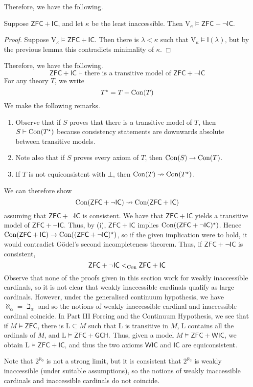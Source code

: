 Therefore, we have the following.
\begin{theorem}
    Suppose \( \mathsf{ZFC} + \mathsf{IC} \), and let \( \kappa \) be the least inaccessible.
    Then \( \mathrm{V}_\kappa \vDash \mathsf{ZFC} + \neg\mathsf{IC} \).
\end{theorem}
\begin{proof}
    Suppose \( \mathrm{V}_\kappa \vDash \mathsf{ZFC} + \mathsf{IC} \).
    Then there is \( \lambda < \kappa \) such that \( \mathrm{V}_\kappa \vDash \mathsf{I}(\lambda) \), but by the previous lemma this contradicts minimality of \( \kappa \).
\end{proof}
Therefore, we have the following.
\[ \mathsf{ZFC} + \mathsf{IC} \vdash \text{there is a transitive model of } \mathsf{ZFC} + \neg\mathsf{IC} \]
For any theory \( T \), we write
\[ T^\star = T + \operatorname{Con}(T) \]
We make the following remarks.
\begin{enumerate}
    \item Observe that if \( S \) proves that there is a transitive model of \( T \), then \( S \vdash \operatorname{Con}(T^\star) \) because consistency statements are downwards absolute between transitive models.
    \item Note also that if \( S \) proves every axiom of \( T \), then \( \operatorname{Con}(S) \to \operatorname{Con}(T) \).
    \item If \( T \) is not equiconsistent with \( \bot \), then \( \operatorname{Con}(T) \nrightarrow \operatorname{Con}(T^\star) \).
\end{enumerate}
We can therefore show
\[ \operatorname{Con}(\mathsf{ZFC} + \neg\mathsf{IC}) \nrightarrow \operatorname{Con}(\mathsf{ZFC} + \mathsf{IC}) \]
assuming that \( \mathsf{ZFC} + \neg\mathsf{IC} \) is consistent.
We have that \( \mathsf{ZFC} + \mathsf{IC} \) yields a transitive model of \( \mathsf{ZFC} + \neg\mathsf{IC} \).
Thus, by (i), \( \mathsf{ZFC} + \mathsf{IC} \) implies \( \operatorname{Con}((\mathsf{ZFC} + \neg\mathsf{IC})^\star) \).
Hence \( \operatorname{Con}(\mathsf{ZFC} + \mathsf{IC}) \to \operatorname{Con}((\mathsf{ZFC} + \neg\mathsf{IC})^\star) \), so if the given implication were to hold, it would contradict G\"odel's second incompleteness theorem.
Thus, if \( \mathsf{ZFC} + \neg\mathsf{IC} \) is consistent,
\[ \mathsf{ZFC} + \neg\mathsf{IC} <_{\operatorname{Con}} \mathsf{ZFC} + \mathsf{IC} \]
Observe that none of the proofs given in this section work for weakly inaccessible cardinals, so it is not clear that weakly inaccessible cardinals qualify as large cardinals.
However, under the generalised continuum hypothesis, we have \( \aleph_\alpha = \beth_\alpha \) and so the notions of weakly inaccessible cardinal and inaccessible cardinal coincide.
In Part III Forcing and the Continuum Hypothesis, we see that if \( M \vDash \mathsf{ZFC} \), there is \( \mathrm{L} \subseteq M \) such that \( \mathrm{L} \) is transitive in \( M \), \( \mathrm{L} \) contains all the ordinals of \( M \), and \( \mathrm{L} \vDash \mathsf{ZFC} + \mathsf{GCH} \).
Thus, given a model \( M \vDash \mathsf{ZFC} + \mathsf{WIC} \), we obtain \( \mathrm{L} \vDash \mathsf{ZFC} + \mathsf{IC} \), and thus the two axioms \( \mathsf{WIC} \) and \( \mathsf{IC} \) are equiconsistent.

Note that \( 2^{\aleph_0} \) is not a strong limit, but it is consistent that \( 2^{\aleph_0} \) is weakly inaccessible (under suitable assumptions), so the notions of weakly inaccessible cardinals and inaccessible cardinals do not coincide.
